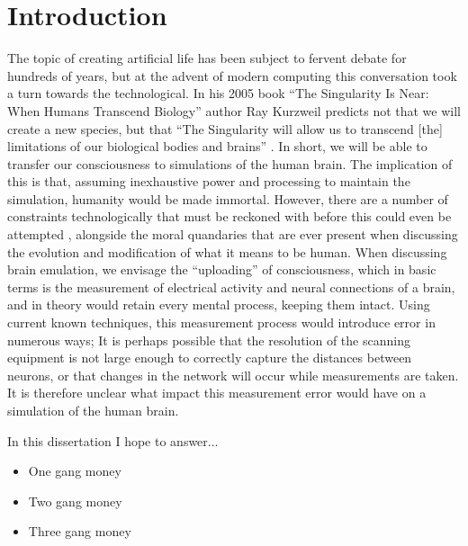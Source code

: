 \chapter{Introduction}

The topic of creating artificial life has been subject to fervent debate for
hundreds of years, but at the advent of modern computing this conversation took
a turn towards the technological. In his 2005 book “The Singularity Is Near:
When Humans Transcend Biology” author Ray Kurzweil predicts not that we will
create a new species, but that “The Singularity will allow us to transcend [the]
limitations of our biological bodies and brains”
\parencite{kurzweil_singularity_2006}.
In short, we will be able to transfer our
consciousness to simulations of the human brain. The implication of this is
that, assuming inexhaustive power and processing to maintain the simulation,
humanity would be made immortal. However, there are a number of constraints
technologically that must be reckoned with before this could even be attempted
\parencite{bostrom_whole_2008}, alongside the moral quandaries that are ever
present when discussing the evolution and modification of what it means to be
human. When discussing brain emulation, we envisage the “uploading” of
consciousness, which in basic terms is the measurement of electrical activity
and neural connections of a brain, and in theory would retain every mental
process, keeping them intact. Using current known techniques, this
measurement process would introduce error in numerous ways; It is perhaps
possible that the resolution of the scanning equipment is not large enough to
correctly capture the distances between neurons, or that changes in the network
will occur while measurements are taken. It is therefore unclear what impact
this measurement error would have on a simulation of the human brain.

In this dissertation I hope to answer... 

\begin{itemize}
    \item One gang money
    \item Two gang money
    \item Three gang money
\end{itemize}
